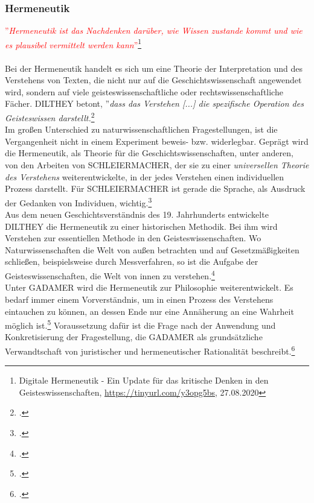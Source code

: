 \documentclass[12pt,a4paper]{article}
\begin{document}
\subsubsection{Hermeneutik}
\textcolor{red}{
''\textit{Hermeneutik ist das Nachdenken darüber, wie Wissen zustande kommt und wie es plausibel vermittelt werden kann}''\footnote{Digitale Hermeneutik - Ein Update für das kritische Denken in den Geisteswissenschaften, \url{https://tinyurl.com/y3opg5bs}, 27.08.2020}
}
\\
\\
Bei der Hermeneutik handelt es sich um eine Theorie der Interpretation und des Verstehens von Texten, die nicht nur auf die Geschichtswissenschaft angewendet wird, sondern auf viele geisteswissenschaftliche oder rechtswissenschaftliche Fächer.
DILTHEY betont, ''\textit{dass das Verstehen [...] die spezifische Operation des Geisteswissen darstellt.}\footcite[][S.82]{ficara2015hermeneutik}
\\
Im großen Unterschied zu naturwissenschaftlichen Fragestellungen, ist die Vergangenheit nicht in einem Experiment beweis- bzw. widerlegbar. Geprägt wird die Hermeneutik, als Theorie für die Geschichtswissenschaften, unter anderen, von den Arbeiten von SCHLEIERMACHER, der sie zu einer \textit{universellen Theorie des Verstehens} weiterentwickelte, in der jedes Verstehen einen individuellen Prozess darstellt. Für SCHLEIERMACHER ist gerade die Sprache, als Ausdruck der Gedanken von Individuen, wichtig.\footcite[][S.72-81]{ficara2015hermeneutik} 
\\
Aus dem neuen Geschichtsverständnis des 19. Jahrhunderts entwickelte DILTHEY die Hermeneutik zu einer historischen Methodik. Bei ihm wird Verstehen zur essentiellen Methode in den Geisteswissenschaften. Wo Naturwissenschaften die Welt von außen betrachten und auf Gesetzmäßigkeiten schließen, beispielsweise durch Messverfahren, so ist die Aufgabe der Geisteswissenschaften, die Welt von innen zu verstehen.\footcite[][S.82-83]{ficara2015hermeneutik}
\\
Unter GADAMER wird die Hermeneutik zur Philosophie weiterentwickelt. Es bedarf immer einem Vorverständnis, um in einen Prozess des Verstehens eintauchen zu können, an dessen Ende nur eine Annäherung an eine Wahrheit möglich ist.\footcite[][S.19-30]{schulz2010neuere} Voraussetzung dafür ist die Frage nach der Anwendung und Konkretisierung der Fragestellung, die GADAMER als grundsätzliche Verwandtschaft von juristischer und hermeneutischer Rationalität beschreibt.\footcite[][S.176-178]{ficara2015hermeneutik}
\\
\end{document}
